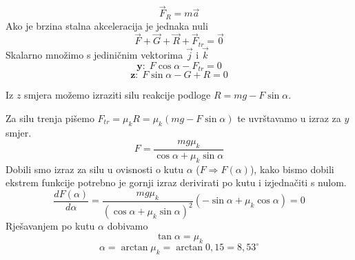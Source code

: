 

$$ \vec{F}_R=m\vec{a}$$
Ako je brzina stalna akceleracija je jednaka nuli
$$\vec{F}+\vec{G}+\vec{R}+\vec{F}_{tr}=\vec{0} $$
Skalarno množimo s jediničnim vektorima $\vec{j}$ i $\vec{k}$
$$ \textbf{y:}\ \  F\cos\alpha -F_{tr}=0 $$
$$  \textbf{z:}\ \ F\sin\alpha-G + R =0$$

Iz $z$ smjera možemo izraziti silu reakcije podloge
$R=mg-F\sin\alpha$.
 
Za silu trenja pišemo $F_{tr}=\mu_k R=\mu_k (mg-F\sin\alpha)$ te uvrštavamo u izraz za $y$ smjer.
$$
F=\frac{mg\mu_k}{\cos\alpha+\mu_k\sin\alpha}
$$
Dobili smo izraz za silu u ovisnosti o kutu $\alpha$ ($F\Rightarrow F(\alpha)$), kako bismo dobili ekstrem funkcije potrebno je gornji izraz derivirati po kutu i izjednačiti s nulom. 
$$
\frac{d F(\alpha)}{d \alpha}= \frac{mg\mu_k}{(\cos\alpha+\mu_k\sin\alpha)^2}(-\sin\alpha+\mu_k\cos\alpha)=0
$$
Rješavanjem po kutu $\alpha$ dobivamo 
$$
\tan\alpha=\mu_k
$$
$$
\alpha= \arctan\mu_k=\arctan0,15=8,53^\circ
$$



